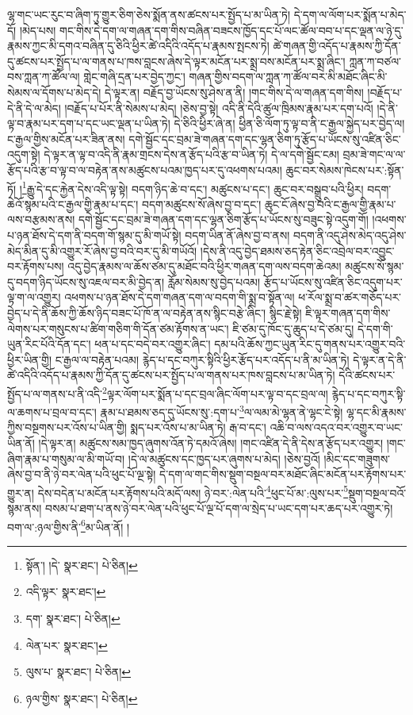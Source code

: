 ལྷ་གང་ཡང་རུང་བ་ཞིག་ཏུ་གྱུར་ཅིག་ཅེས་སྨོན་ནས་ཚངས་པར་སྤྱོད་པ་མ་ཡིན་ཏེ། དེ་དག་ལ་ལོག་པར་སྨོན་པ་མེད་དོ། །མེད་པས། གང་གིས་དེ་དག་ལ་གཞན་དག་གིས་བཞིན་བཟངས་ཁྱོད་དང་པོ་ལང་ཚོལ་བབ་པ་དང་ལྡན་ལ་ཉེ་དུ་རྣམས་ཀྱང་མི་དགའ་བཞིན་དུ་ཅིའི་ཕྱིར་ཚེ་འདིའི་འདོད་པ་རྣམས་སྤངས་ཏེ། ཚེ་གཞན་གྱི་འདོད་པ་རྣམས་ཀྱི་དོན་དུ་ཚངས་པར་སྤྱོད་པ་ལ་གནས་པ་ཁས་བླངས་ཞེས་དེ་ལྟར་མངོན་པར་སྨྲ་བས་མངོན་པར་སྨྲ་ཞིང་། ཀླན་ཀ་བཙལ་བས་ཀླན་ཀ་ཚོལ་ལ། གླེང་གཞི་དྲན་པར་བྱེད་ཀྱང་། གཞན་གྱིས་བདག་ལ་ཀླན་ཀ་ཚོལ་བར་མི་མཐོང་ཞིང་མི་སེམས་ལ་དོགས་པ་མེད་དེ། དེ་ལྟར་ན། བརྗོད་བྱ་ཡོངས་སུ་ཤེས་ན་ནི། །གང་གིས་དེ་ལ་གཞན་དག་གིས། །བརྗོད་པ་དེ་ནི་དེ་ལ་མེད། །བརྗོད་པ་པོར་ནི་སེམས་པ་མེད། །ཅེས་བྱ་སྟེ། འདི་ནི་དེའི་ཚུལ་ཁྲིམས་རྣམ་པར་དག་པའོ། །དེ་ནི་ལྟ་བ་རྣམ་པར་དག་པ་དང་ཡང་ལྡན་པ་ཡིན་ཏེ། དེ་ཅིའི་ཕྱིར་ཞེ་ན། ཕྱིན་ཅི་ལོག་ཏུ་ལྟ་བ་ནི་ང་རྒྱལ་སྐྱེད་པར་བྱེད་ལ། ང་རྒྱལ་གྱིས་མངོན་པར་ཟིན་ནས། དགེ་སྦྱོང་དང་བྲམ་ཟེ་གཞན་དག་དང་ལྷན་ཅིག་ཏུ་རྩོད་པ་ཡོངས་སུ་འཛིན་ཅིང་འདུག་སྟེ། དེ་ལྟར་ན་ལྟ་བ་འདི་ནི་རྣམ་གྲངས་དེས་ན་རྩོད་པའི་རྩ་བ་ཡིན་ཏེ། དེ་ལ་དགེ་སྦྱོང་ངམ། བྲམ་ཟེ་གང་ལ་ལ་རྩོད་པའི་རྩ་བ་ལྟ་བ་ལ་བརྟེན་ནས་མཚུངས་པའམ་ཁྱད་པར་དུ་འཕགས་པའམ། ཆུང་བར་སེམས་ཁེངས་པར་:སྟོན་ཏོ། །\footnote{སྟོན་། །དེ་  སྣར་ཐང་།  པེ་ཅིན། }རྒྱུ་དེ་དང་རྐྱེན་དེས་འདི་ལྟ་སྟེ། བདག་ཉིད་ཆེ་བ་དང་། མཚུངས་པ་དང་། ཆུང་བར་བསྒྲུབ་པའི་ཕྱིར། བདག་ཆེའོ་སྙམ་པའི་ང་རྒྱལ་གྱི་རྣམ་པ་དང་། བདག་མཚུངས་སོ་ཞེས་བྱ་བ་དང་། ཆུང་ངོ་ཞེས་བྱ་བའི་ང་རྒྱལ་གྱི་རྣམ་པ་ལས་བརྩམས་ནས། དགེ་སྦྱོང་དང་བྲམ་ཟེ་གཞན་དག་དང་ལྷན་ཅིག་རྩོད་པ་ཡོངས་སུ་བཟུང་སྟེ་འདུག་གོ། །འཕགས་པ་ཉན་ཐོས་དེ་དག་ནི་བདག་གོ་སྙམ་དུ་མི་གཡོ་སྟེ། བདག་ཡིན་ནོ་ཞེས་བྱ་བ་ནས། བདག་ནི་འདུ་ཤེས་མེད་འདུ་ཤེས་མེད་མིན་དུ་མི་འགྱུར་རོ་ཞེས་བྱ་བའི་བར་དུ་མི་གཡོའོ། །དེས་ནི་འདུ་བྱེད་ཐམས་ཅད་རྟེན་ཅིང་འབྲེལ་བར་འབྱུང་བར་རྟོགས་པས། འདུ་བྱེད་རྣམས་ལ་ཆོས་ཙམ་དུ་མཐོང་བའི་ཕྱིར་གཞན་དག་ལས་བདག་ཆེའམ། མཚུངས་སོ་སྙམ་དུ་བདག་ཉིད་ཡོངས་སུ་འཇལ་བར་མི་བྱེད་ན། རློམ་སེམས་སུ་བྱེད་པའམ། རྩོད་པ་ཡོངས་སུ་འཛིན་ཅིང་འདུག་པར་ལྟ་ག་ལ་འགྱུར། འཕགས་པ་ཉན་ཐོས་དེ་དག་གཞན་དག་ལ་བདག་གི་སྨྲ་བ་སྟོན་ལ། ཕ་རོལ་སྨྲ་བ་ཚར་གཅོད་པར་བྱེད་པ་དེ་ནི་ཆོས་ཀྱི་ཆོས་ཉིད་བཟང་པོ་ཁོ་ན་ལ་བརྟེན་ནས་སྙིང་བརྩེ་ཞིང་། སྙིང་རྗེ་སྟེ། ཇི་ལྟར་གཞན་དག་གིས་ལེགས་པར་གསུངས་པ་ཚིག་གཅིག་གི་དོན་ཙམ་རྟོགས་ན་ཡང་། ཇི་ཙམ་དུ་ཁོང་དུ་ཆུད་པ་དེ་ཙམ་དུ། དེ་དག་གི་ཡུན་རིང་པོའི་དོན་དང་། ཕན་པ་དང་བདེ་བར་འགྱུར་ཞིང་། དམ་པའི་ཆོས་ཀྱང་ཡུན་རིང་དུ་གནས་པར་འགྱུར་བའི་ཕྱིར་ཡིན་གྱི། ང་རྒྱལ་ལ་བརྟེན་པའམ། རྙེད་པ་དང་བཀུར་སྟིའི་ཕྱིར་རྩོད་པར་འདོད་པ་ནི་མ་ཡིན་ཏེ། དེ་ལྟར་ན་དེ་ནི་ཚེ་འདིའི་འདོད་པ་རྣམས་ཀྱི་དོན་དུ་ཚངས་པར་སྤྱོད་པ་ལ་གནས་པར་ཁས་བླངས་པ་མ་ཡིན་ཏེ། དེའི་ཚངས་པར་སྤྱོད་པ་ལ་གནས་པ་ནི་འདི་\footnote{འདི་ལྟར་  སྣར་ཐང་། }ལྟར་ལོག་པར་སྨོན་པ་དང་བྲལ་ཞིང་ལོག་པར་ལྟ་བ་དང་བྲལ་ལ། རྙེད་པ་དང་བཀུར་སྟི་ལ་ཆགས་པ་བྲལ་བ་དང་། རྣམ་པ་ཐམས་ཅད་དུ་ཡོངས་སུ་:དག་པ་\footnote{དག་  སྣར་ཐང་།  པེ་ཅིན། }ལ་ལམ་མེ་ལྷན་ནེ་ལྷང་ངེ་སྟེ། ལྷ་དང་མི་རྣམས་ཀྱིས་བསྔགས་པར་འོས་པ་ཡིན་གྱི། སྨད་པར་འོས་པ་མ་ཡིན་ཏེ། རྒ་བ་དང་། འཆི་བ་ལས་འདའ་བར་འགྱུར་བ་ཡང་ཡིན་ནོ། །དེ་ལྟར་ན། མཚུངས་སམ་ཁྱད་ཞུགས་འོན་ཏེ་དམའོ་ཞེས། །གང་འཛིན་དེ་ནི་དེས་ན་རྩོད་པར་འགྱུར། །གང་ཞིག་རྣམ་པ་གསུམ་ལ་མི་གཡོ་བ། །དེ་ལ་མཚུངས་དང་ཁྱད་པར་ཞུགས་པ་མེད། །ཅེས་བྱའོ། །མིང་དང་གཟུགས་ཞེས་བྱ་བ་ནི་ཉེ་བར་ལེན་པའི་ཕུང་པོ་ལྔ་སྟེ། དེ་དག་ལ་གང་གིས་སྡུག་བསྔལ་བར་མཐོང་ཞིང་མངོན་པར་རྟོགས་པར་གྱུར་ན། དེས་བདེན་པ་མངོན་པར་རྟོགས་པའི་མདོ་ལས། ཉེ་བར་:ལེན་པའི་\footnote{ལེན་པར་  སྣར་ཐང་། }ཕུང་པོ་མ་:ལུས་པར་\footnote{ལུས་པ་  སྣར་ཐང་།  པེ་ཅིན། }སྡུག་བསྔལ་བའོ་སྙམ་ནས། བསམ་པ་ཐག་པ་ནས་ཉེ་བར་ལེན་པའི་ཕུང་པོ་ལྔ་པོ་དག་ལ་སྲེད་པ་ཡང་དག་པར་ཆད་པར་འགྱུར་ཏེ། བག་ལ་:ཉལ་གྱིས་ནི་\footnote{ཉལ་གྱིས་  སྣར་ཐང་།  པེ་ཅིན། }མ་ཡིན་ནོ། །
